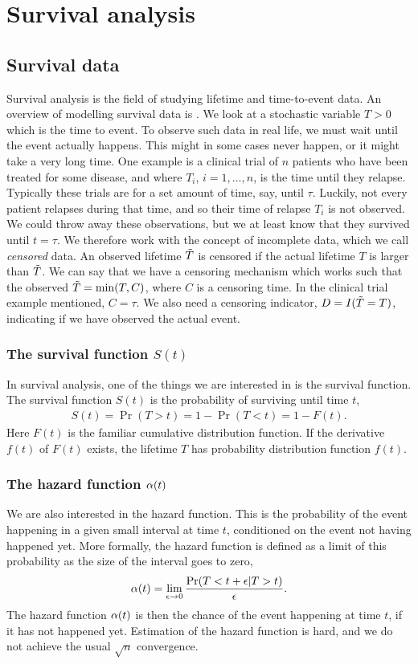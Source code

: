 \chapter{Survival analysis}

\section{Survival data}
Survival analysis is the field of studying lifetime and time-to-event data. An overview of modelling survival data is \citet{ABG}. We look at a stochastic variable $T>0$ which is the time to event. To observe such data in real life, we must wait until the event actually happens. This might in some cases never happen, or it might take a very long time. One example is a clinical trial of $n$ patients who have been treated for some disease, and where $T_i$, $i=1,\ldots,n$, is the time until they relapse. Typically these trials are for a set amount of time, say, until $\tau$. Luckily, not every patient relapses during that time, and so their time of relapse $T_i$ is not observed. We could throw away these observations, but we at least know that they survived until $t=\tau$. We therefore work with the concept of incomplete data, which we call \textit{censored} data. An observed lifetime $\tilde{T}$ is censored if the actual lifetime $T$ is larger than $\tilde{T}$. We can say that we have a censoring mechanism which works such that the observed $\tilde{T}=\min(T, C)$, where $C$ is a censoring time. In the clinical trial example mentioned, $C=\tau$. We also need a censoring indicator, $D=I(\tilde{T}=T)$, indicating if we have observed the actual event.

\subsection{The survival function $S(t)$}
In survival analysis, one of the things we are interested in is the survival function. The survival function $S(t)$ is the probability of surviving until time $t$,
\begin{align*}
    S(t)=\Pr(T>t)=1-\Pr(T<t)=1-F(t).
\end{align*}
Here $F(t)$ is the familiar cumulative distribution function. If the derivative $f(t)$ of $F(t)$ exists, the lifetime $T$ has probability distribution function $f(t)$.

\subsection{The hazard function $\alpha(t)$}
We are also interested in the hazard function. This is the probability of the event happening in a given small interval at time $t$, conditioned on the event not having happened yet. More formally, the hazard function is defined as a limit of this probability as the size of the interval goes to zero,
\begin{equation*}
    \alpha(t)=\lim_{\epsilon\to0}\frac{\Pr(T<t+\epsilon|T>t)}{\epsilon}.
\end{equation*}
The hazard function $\alpha(t)$ is then the chance of the event happening at time $t$, if it has not happened yet. Estimation of the hazard function is hard, and we do not achieve the usual $\sqrt{n}$ convergence.

